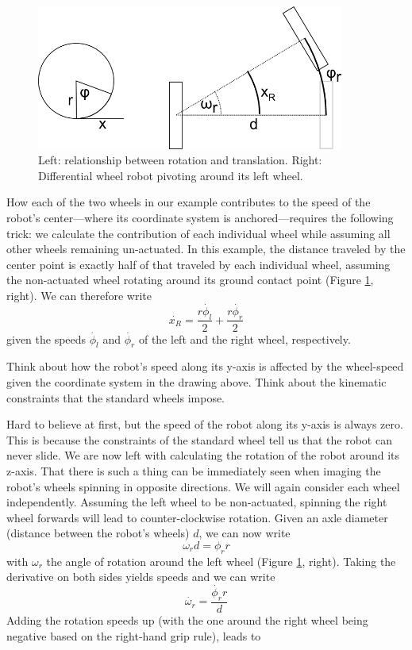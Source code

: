 \begin{figure}[htb!]
	\centering
		\includegraphics[width=0.9\textwidth]{figs/wheelrotation.png}
	\caption{Left: relationship between rotation and translation. Right: Differential wheel robot pivoting around its left wheel.}
	\label{fig:wheelrotation}
\end{figure}

How each of the two wheels in our example contributes to the speed of the robot's center---where its coordinate system is anchored---requires the following trick: we calculate the contribution of each individual wheel while assuming all other wheels remaining un-actuated. In this example, the distance traveled by the center point is exactly half of that traveled by each individual wheel, assuming the non-actuated wheel rotating around its ground contact point (Figure \ref{fig:wheelrotation}, right). We can therefore write
\begin{equation}
\dot{x_R}=\frac{r\dot{\phi_l}}{2}+\frac{r\dot{\phi_r}}{2}
\end{equation}
given the speeds $ \dot{\phi_l}$ and $ \dot{\phi_r}$ of the left and the right wheel, respectively.

\begin{framed}
Think about how the robot's speed along its y-axis is affected by the wheel-speed given the coordinate system in the drawing above. Think about the kinematic constraints that the standard wheels impose.
\end{framed}

Hard to believe at first, but the speed of the robot along its y-axis is always zero. This is because the constraints of the standard wheel tell us that the robot can never slide. We are now left with calculating the rotation of the robot around its z-axis. That there is such a thing can be immediately seen when imaging the robot's wheels spinning in opposite directions. We will again consider each wheel independently. Assuming the left wheel to be non-actuated, spinning the right wheel forwards will lead to counter-clockwise rotation. Given an axle diameter (distance between the robot's wheels) $ d$, we can now write
\begin{equation}
\omega_r d = \phi_r r
\end{equation}
with $ \omega_r$ the angle of rotation around the left wheel (Figure \ref{fig:wheelrotation}, right). Taking the derivative on both sides yields speeds and we can write
\begin{equation}
\dot{\omega_r} = \frac{\dot{\phi_r} r}{d}
\end{equation}
Adding the rotation speeds up (with the one around the right wheel being negative based on the right-hand grip rule), leads to

